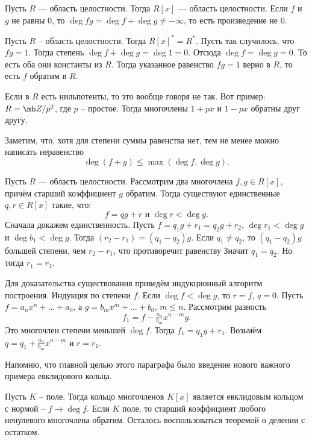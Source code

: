  Пусть $R$ --- область целостности. Тогда $R[x]$ --- область целостности.
\proof Если $f$ и $g$ не равны 0, то $\deg fg =\deg f+ \deg g\neq - \infty$, то есть произведение не 0.
\endproof
\ecrl



\lm Пусть $R$ -- область целостности. Тогда $R[x]^*=R^*$.
\elm 
\proof  Пусть так случилось, что $fg=1$. Тогда степень $\deg f+\deg g=\deg 1=0$. Отсюда $\deg f=\deg g=0$. То есть оба они константы из $R$. Тогда указанное равенство $fg=1$ верно в $R$, то есть $f$ обратим в $R$.
\endproof

\rm Если в $R$ есть нильпотенты, то это вообще говоря не так. Вот пример: $R=\mb Z/p^2$, где $p$ -- простое. Тогда многочлены $1+px$ и $1-px$ обратны друг другу.
\erm

\rm Заметим, что, хотя для степени суммы равенства нет,  тем не менее можно написать неравенство
$$\deg (f+g) \leq \max(\deg f, \deg g).$$
\erm

 Пусть $R$ --- область целостности. Рассмотрим два многочлена $f,g \in R[x]$, причём старший коэффициент $g$ обратим. Тогда существуют единственные $q,r \in R[x]$ такие, что:\\
$$f=qg+r \text{ и } \deg r < \deg g.$$
\ethrm
\proof Сначала докажем единственность. Пусть $f=q_1g+r_1=q_2g+r_2$, $\deg r_1 < \deg g$ и  $\deg b_1 < \deg g$. Тогда $(r_2-r_1)=(q_1-q_2)g$. Если $q_1\neq q_2$, то  $(q_1-q_2)g$ большей степени, чем $r_2-r_1$, что противоречит равенству Значит $q_1=q_2$. Но тогда $r_1=r_2$.

Для доказательства существования приведём индукционный алгоритм построения. Индукция по степени $f$. Если $\deg f<\deg g$, то $r=f$, $q=0$. Пусть $f=a_nx^n+\dots+a_0$, а $g=b_mx^m+\dots + b_0$, $m\leq n$. Рассмотрим разность $$f_1=f-\tfrac{a_n}{b_m}x^{n-m}g.$$
Это многочлен степени меньшей $\deg f$. Тогда $f_1=q_1g+r_1$. Возьмём $q=q_1+\tfrac{a_n}{b_m}x^{n-m}$ и $r=r_1$.
\endproof






Напомню, что главной целью этого параграфа было введение нового важного примера евклидового кольца.

\thrm
Пусть $K$ -- поле. Тогда кольцо многочленов $K[x]$ является евклидовым кольцом с нормой -- $f \to \deg f$.
\proof Если $K$ поле, то старший коэффициент любого ненулевого многочлена обратим. Осталось воспользоваться теоремой о делении с остатком.
\endproof
\ethrm

